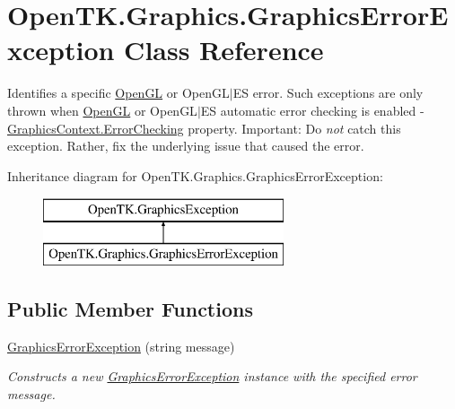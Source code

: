\hypertarget{class_open_t_k_1_1_graphics_1_1_graphics_error_exception}{\section{Open\-T\-K.\-Graphics.\-Graphics\-Error\-Exception Class Reference}
\label{class_open_t_k_1_1_graphics_1_1_graphics_error_exception}
}


Identifies a specific \hyperlink{namespace_open_t_k_1_1_graphics_1_1_open_g_l}{Open\-G\-L} or Open\-G\-L$|$\-E\-S error. Such exceptions are only thrown when \hyperlink{namespace_open_t_k_1_1_graphics_1_1_open_g_l}{Open\-G\-L} or Open\-G\-L$|$\-E\-S automatic error checking is enabled -\/ \hyperlink{class_open_t_k_1_1_graphics_1_1_graphics_context_a8ad06302403c5503b6ba954676523d90}{Graphics\-Context.\-Error\-Checking} property. Important\-: Do {\itshape not} catch this exception. Rather, fix the underlying issue that caused the error.  


Inheritance diagram for Open\-T\-K.\-Graphics.\-Graphics\-Error\-Exception\-:\begin{figure}[H]
\begin{center}
\leavevmode
\includegraphics[height=2.000000cm]{class_open_t_k_1_1_graphics_1_1_graphics_error_exception}
\end{center}
\end{figure}
\subsection*{Public Member Functions}
\begin{DoxyCompactItemize}
\item 
\hyperlink{class_open_t_k_1_1_graphics_1_1_graphics_error_exception_afe758cd34ee6ff7c8694fddf9df925b4}{Graphics\-Error\-Exception} (string message)
\begin{DoxyCompactList}\small\item\em Constructs a new \hyperlink{class_open_t_k_1_1_graphics_1_1_graphics_error_exception}{Graphics\-Error\-Exception} instance with the specified error message. \end{DoxyCompactList}\end{DoxyCompactItemize}


